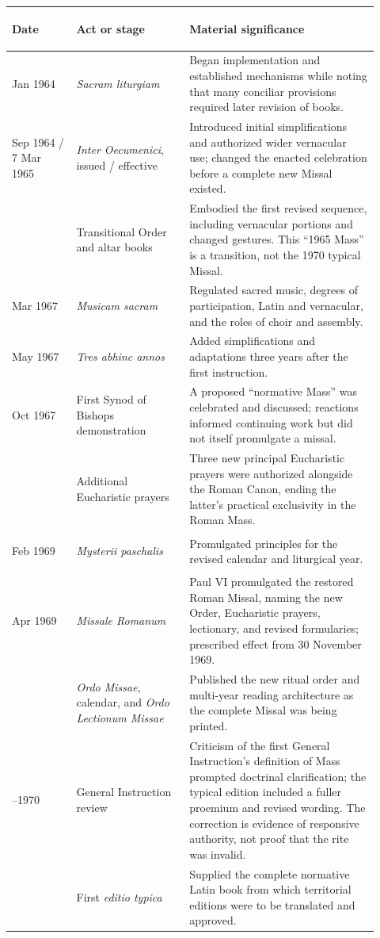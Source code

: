 \begin{longtable}{>{\bfseries\raggedright\arraybackslash}p{0.16\linewidth}>{\raggedright\arraybackslash}p{0.29\linewidth}>{\raggedright\arraybackslash}p{0.47\linewidth}}
\toprule
\textbf{Date} & \textbf{Act or stage} & \textbf{Material significance}\\
\midrule
\endhead
25 Jan 1964 & \emph{Sacram liturgiam} & Began implementation and established mechanisms while noting that many conciliar provisions required later revision of books.\\
26 Sep 1964 / 7 Mar 1965 & \emph{Inter Oecumenici}, issued / effective & Introduced initial simplifications and authorized wider vernacular use; changed the enacted celebration before a complete new Missal existed.\\
1965 & Transitional Order and altar books & Embodied the first revised sequence, including vernacular portions and changed gestures. This “1965 Mass” is a transition, not the 1970 typical Missal.\\
5 Mar 1967 & \emph{Musicam sacram} & Regulated sacred music, degrees of participation, Latin and vernacular, and the roles of choir and assembly.\\
4 May 1967 & \emph{Tres abhinc annos} & Added simplifications and adaptations three years after the first instruction.\\
Oct 1967 & First Synod of Bishops demonstration & A proposed “normative Mass” was celebrated and discussed; reactions informed continuing work but did not itself promulgate a missal.\\
1968 & Additional Eucharistic prayers & Three new principal Eucharistic prayers were authorized alongside the Roman Canon, ending the latter's practical exclusivity in the Roman Mass.\\
14 Feb 1969 & \emph{Mysterii paschalis} & Promulgated principles for the revised calendar and liturgical year.\\
3 Apr 1969 & \emph{Missale Romanum} & Paul VI promulgated the restored Roman Missal, naming the new Order, Eucharistic prayers, lectionary, and revised formularies; prescribed effect from 30 November 1969.\\
1969 & \emph{Ordo Missae}, calendar, and \emph{Ordo Lectionum Missae} & Published the new ritual order and multi-year reading architecture as the complete Missal was being printed.\\
1969--1970 & General Instruction review & Criticism of the first General Instruction's definition of Mass prompted doctrinal clarification; the typical edition included a fuller proemium and revised wording. The correction is evidence of responsive authority, not proof that the rite was invalid.\\
1970 & First \emph{editio typica} & Supplied the complete normative Latin book from which territorial editions were to be translated and approved.\\
\bottomrule
\end{longtable}

